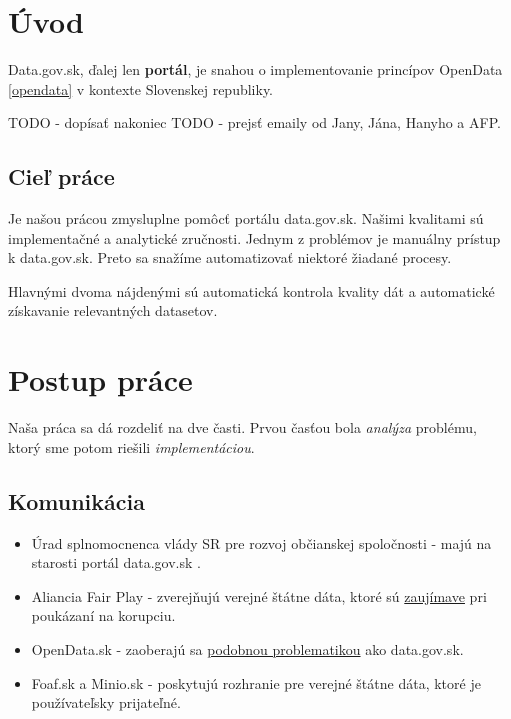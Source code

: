 \documentclass[12pt,a4paper]{article}
\begin{document}
\newpage

\section{Úvod}

Data.gov.sk, ďalej len {\bf portál}, je snahou o implementovanie princípov OpenData \ref{opendata} v kontexte Slovenskej republiky. 

TODO - dopísať nakoniec 
TODO - prejsť emaily od Jany, Jána, Hanyho a AFP. 

\subsection{Cieľ práce}
Je našou prácou zmysluplne pomôcť portálu data.gov.sk. Našimi kvalitami sú implementačné a analytické zručnosti. Jednym z problémov je manuálny prístup k data.gov.sk. Preto sa snažíme automatizovať niektoré žiadané procesy. 

Hlavnými dvoma nájdenými sú automatická kontrola kvality dát a automatické získavanie relevantných datasetov. 


\section{Postup práce}
Naša práca sa dá rozdeliť na dve časti. Prvou časťou bola \emph{analýza} problému, ktorý sme potom riešili \emph{implementáciou}. 

\subsection{Komunikácia}
\begin{itemize} 
  \item Úrad splnomocnenca vlády SR pre rozvoj občianskej spoločnosti - majú na starosti portál data.gov.sk .
  \item Aliancia Fair Play - zverejňujú verejné štátne dáta, ktoré sú \href{http://datanest.fair-play.sk/pages/index}{zaujímave} pri poukázaní na korupciu. 
  \item OpenData.sk - zaoberajú sa \href{http://opendata.sk/liferay/studia-open-data-portal}{podobnou problematikou} ako data.gov.sk. 
  \item Foaf.sk a Minio.sk - poskytujú rozhranie pre verejné štátne dáta, ktoré je používateľsky prijateľné.  
\end{itemize} 
\end{document}
